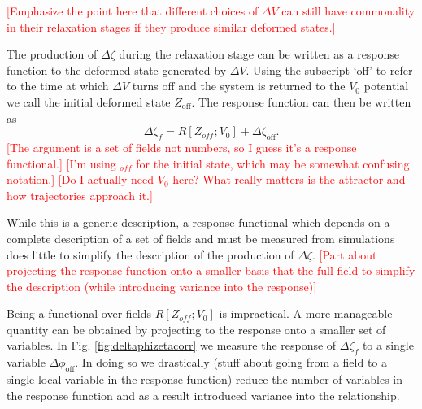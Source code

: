 \textcolor{red}{[Emphasize the point here that different choices of $\Delta V$ can still have commonality in their relaxation stages if they produce similar deformed states.]}

The production of $\Delta\zeta$ during the relaxation stage can be written as a response function to the deformed state generated by $\Delta V$. Using the subscript `off' to refer to the time at which $\Delta V$ turns off and the system is returned to the $V_0$ potential we call the initial deformed state $Z_\mathrm{off}$. The response function can then be written as 
\begin{equation}
  \Delta\zeta_f = R[Z_{off};V_0] + \Delta\zeta_\mathrm{off}.
\end{equation}
\textcolor{red}{[The argument is a set of fields not numbers, so I guess it's a response functional.]}
\textcolor{red}{[I'm using ${}_{off}$ for the initial state, which may be somewhat confusing notation.]}
\textcolor{red}{[Do I actually need $V_0$ here? What really matters is the attractor and how trajectories approach it.]}



While this is a generic description, a response functional which depends on a complete description of a set of fields and must be measured from simulations does little to simplify the description of the production of $\Delta\zeta$.
\textcolor{red}{[Part about projecting the response function onto a smaller basis that the full field to simplify the description (while introducing variance into the response)]}

Being a functional over fields $R[Z_{off};V_0]$ is impractical. A more manageable quantity can be obtained by projecting to the response onto a smaller set of variables. In Fig. \ref{fig:deltaphizetacorr} we measure the response of $\Delta\zeta_f$ to a single variable $\Delta\phi_\mathrm{off}$. In doing so we drastically
(stuff about going from a field to a single local variable in the response function)
reduce the number of variables in the response function and as a result introduced variance into the relationship.


